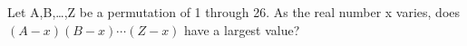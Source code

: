 Let A,B,\ldots,Z be a permutation of 1 through 26. As the real number x varies, does $(A-x)(B-x)\cdots(Z-x)$ have a largest value?

